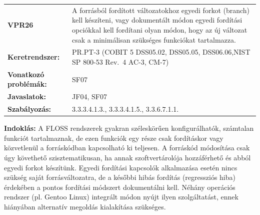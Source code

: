 \documentclass[12pt,magyar,a4paper,oneside]{scrreprt}
\begin{document}
\begin{longtable}[]{@{}ll@{}}
\toprule
\endhead
\begin{minipage}[t]{0.16\columnwidth}\raggedright
\textbf{VPR26}\strut
\end{minipage} & \begin{minipage}[t]{0.79\columnwidth}\raggedright
A forrásból fordított változatokhoz egyedi forkot (branch) kell
készíteni, vagy dokumentált módon egyedi fordítási opciókkal kell
fordítani olyan módon, hogy az új változat csak a minimálisan szükséges
funkciókat tartalmazza.\strut
\end{minipage}\tabularnewline
\begin{minipage}[t]{0.16\columnwidth}\raggedright
\textbf{Keretrendszer:}\strut
\end{minipage} & \begin{minipage}[t]{0.79\columnwidth}\raggedright
PR.PT-3 (COBIT 5 DSS05.02, DSS05.05, DSS06.06,NIST SP 800-53 Rev.~4
AC-3, CM-7)\strut
\end{minipage}\tabularnewline
\begin{minipage}[t]{0.16\columnwidth}\raggedright
\textbf{Vonatkozó problémák:}\strut
\end{minipage} & \begin{minipage}[t]{0.79\columnwidth}\raggedright
SF07\strut
\end{minipage}\tabularnewline
\begin{minipage}[t]{0.16\columnwidth}\raggedright
\textbf{Javaslatok:}\strut
\end{minipage} & \begin{minipage}[t]{0.79\columnwidth}\raggedright
JF04, SF07\strut
\end{minipage}\tabularnewline
\begin{minipage}[t]{0.16\columnwidth}\raggedright
\textbf{Szabályozás:}\strut
\end{minipage} & \begin{minipage}[t]{0.79\columnwidth}\raggedright
3.3.3.4.1.3., 3.3.3.4.1.5., 3.3.6.7.1.1.\strut
\end{minipage}\tabularnewline
\bottomrule
\end{longtable}

\textbf{Indoklás: } A FLOSS rendszerek gyakran széleskörűen
konfigurálhatók, számtalan funkciót tartalmaznak, de ezen funkciók egy
része csak fordításkor vagy közvetlenül a forráskódban kapcsolható ki
teljesen. A forráskód módosítása csak úgy követhető szisztematikusan, ha
annak szoftvertárolója hozzáférhető és abból egyedi forkot készítünk.
Egyedi fordítási kapcsolók alkalmazása esetén nincs szükség saját
forrásváltozatra, de a későbbi hibás fordítás (regressziós hiba)
érdekében a pontos fordítási módszert dokumentálni kell. Néhány
operációs rendszer (pl. Gentoo Linux) integrált módon nyújt ilyen
szolgáltatást, ennek hiányában alternatív megoldás kialakítása
szükséges.
\end{document}
